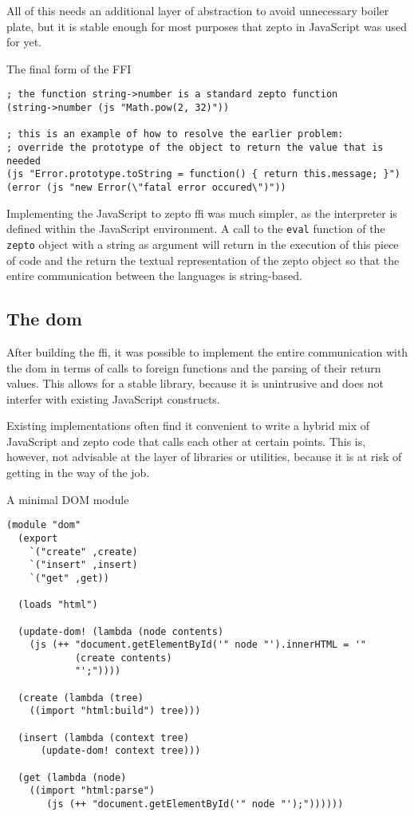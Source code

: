 \documentclass[oneside,11pt,xetex]{scrbook}
\begin{document}
All of this needs an additional layer of abstraction to avoid unnecessary
boiler plate, but it is stable enough for most purposes that zepto in JavaScript
was used for yet.

\begin{listing}[H]
\caption{The final form of the FFI}
\begin{verbatim}
; the function string->number is a standard zepto function
(string->number (js "Math.pow(2, 32)"))

; this is an example of how to resolve the earlier problem:
; override the prototype of the object to return the value that is needed
(js "Error.prototype.toString = function() { return this.message; }")
(error (js "new Error(\"fatal error occured\")"))
\end{verbatim}
\end{listing}

Implementing the JavaScript to zepto \gls{ffi} was much simpler, as the
interpreter is defined within the JavaScript environment. A call to the
\texttt{eval} function of the \texttt{zepto} object with a string as argument
will return in the execution of this piece of code and the return the textual
representation of the zepto object so that the entire communication between
the languages is string-based.

\subsection{The \gls{dom}}

After building the \gls{ffi}, it was possible to implement the entire
communication with the \gls{dom} in terms of calls to foreign functions
and the parsing of their return values. This allows for a stable library,
because it is unintrusive and does not interfer with existing JavaScript
constructs.

Existing implementations often find it convenient to write a hybrid mix
of JavaScript and zepto code that calls each other at certain points.
This is, however, not advisable at the layer of libraries or utilities,
because it is at risk of getting in the way of the job.

\begin{listing}[H]
\caption{A minimal DOM module}
\begin{verbatim}
(module "dom"
  (export
    `("create" ,create)
    `("insert" ,insert)
    `("get" ,get))

  (loads "html")

  (update-dom! (lambda (node contents)
    (js (++ "document.getElementById('" node "').innerHTML = '"
            (create contents)
            "';"))))

  (create (lambda (tree)
    ((import "html:build") tree)))

  (insert (lambda (context tree)
      (update-dom! context tree)))

  (get (lambda (node)
    ((import "html:parse")
       (js (++ "document.getElementById('" node "');"))))))
\end{verbatim}
\end{listing}
\end{document}
